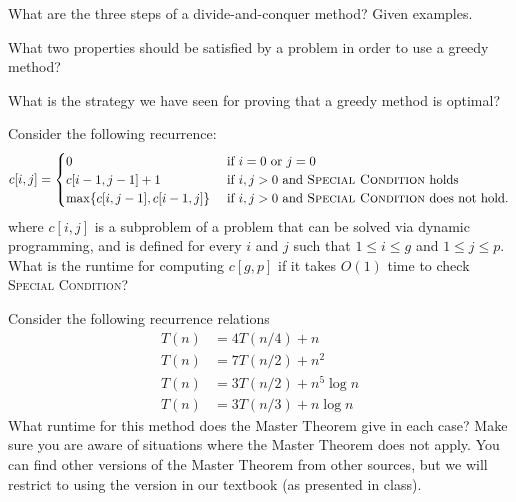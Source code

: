 \documentclass[11  pt]{exam}
\begin{document}
	\begin{questions}
		
		\question What are the three steps of a divide-and-conquer method? Given examples.
		
		\question What two properties should be satisfied by a problem in order to use a greedy method?
		
		\question What is the strategy we have seen for proving that a greedy method is optimal?
		
		\question Consider the following recurrence:
		\begin{equation*}
			c[i,j] =\begin{cases}
				0 & \text{ if $i = 0$ or $j = 0$} \\
				c[i-1, j-1] + 1 & \text{ if $i,j > 0$ and \textsc{Special Condition} holds}\\
				\max \{ c[i,j-1], c[i-1,j]\} & \text{ if $i,j > 0$ and \textsc{Special Condition} does not hold}.
			\end{cases}
		\end{equation*}
		where $c[i,j]$ is a subproblem of a problem that can be solved via dynamic programming, and is defined for every $i$ and $j$ such that $1 \leq i \leq g$ and $1 \leq j \leq p$. What is the runtime for computing $c[g,p]$ if it takes $O(1)$ time to check \textsc{Special Condition}?
		
		\question Consider the following recurrence relations
		\begin{align*}
			T(n) &= 4T(n/4) + n \\
			T(n) &= 7T(n/2) + n^2 \\
			T(n) &= 3T(n/2) + n^5 \log n\\
			T (n) &= 3T (n/3) + n \log n 
		\end{align*}
		What runtime for this method does the Master Theorem give in each case? Make sure you are aware of situations where the Master Theorem does not apply. You can find other versions of the Master Theorem from other sources, but we will restrict to using the version in our textbook (as presented in class).
		
%


\end{questions}
\end{document}
